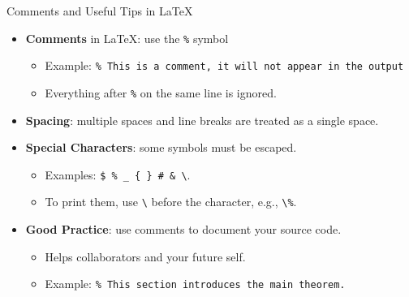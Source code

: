 \begin{frame}{Comments and Useful Tips in \LaTeX}
	
	\begin{itemize}
		\item \textbf{Comments} in \LaTeX: use the \texttt{\%} symbol
		\begin{itemize}
			\item Example: \texttt{\% This is a comment, it will not appear in the output}
			\item Everything after \texttt{\%} on the same line is ignored.
		\end{itemize}
		\vspace{0.3cm}
		
		\item \textbf{Spacing}: multiple spaces and line breaks are treated as a single space.
		\vspace{0.3cm}
		
		\item \textbf{Special Characters}: some symbols must be escaped.
		\begin{itemize}
			\item Examples: \texttt{\$ \% \_ \{ \} \# \& \textbackslash}.
			\item To print them, use \texttt{\textbackslash} before the character, e.g., \texttt{\textbackslash\%}.
		\end{itemize}
		
		\vspace{0.3cm}
		\item \textbf{Good Practice}: use comments to document your source code.
		\begin{itemize}
			\item Helps collaborators and your future self.
			\item Example: \texttt{\% This section introduces the main theorem.}
		\end{itemize}
%		
	\end{itemize}
	
\end{frame}

